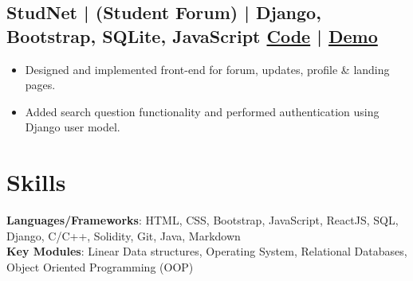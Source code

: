 \documentclass[a4,10pt]{article}
\newenvironment{zitemize}{
\begin{itemize}\itemsep0pt \parskip0pt \parsep1pt}
{\end{itemize}\vspace{-0.5cm}}
\begin{document}
\subsection*{StudNet {\normalsize\normalfont | (Student Forum) | Django, Bootstrap, SQLite, JavaScript} \hfill {\href{https://github.com/DevelopersLeague/StudNet}{Code} }|  {\href{https://stud-net.herokuapp.com/}{Demo} }} 
    \begin{zitemize}
        \item Designed and implemented front-end for forum, updates, profile \& landing pages.
        \item Added search question functionality and performed authentication using Django user model.
    \end{zitemize}

\vspace{0.1cm}

        




\section{Skills}
\textbf{Languages/Frameworks}: HTML, CSS, Bootstrap, JavaScript, ReactJS, SQL, Django, C/C++, Solidity, Git, Java, Markdown \\ 
\textbf{Key Modules}: Linear Data structures, Operating System, Relational Databases, Object Oriented Programming (OOP)
\vspace{-0.2cm}
\end{document}
